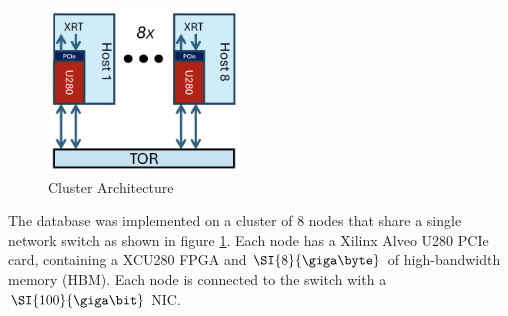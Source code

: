 
\begin{figure}
	\centering
	\includegraphics[width=2in]{oct-arch.jpg}
	\caption{Cluster Architecture}
	\label{oct-arch}
\end{figure}

The database was implemented on a cluster of 8 nodes that share a single network
switch as shown in figure \ref{oct-arch}. Each node has a Xilinx Alveo U280 PCIe
card, containing a XCU280 FPGA and $\SI{8}{\giga\byte}$ of high-bandwidth memory
(HBM). Each node is connected to the switch with a $\SI{100}{\giga\bit}$ NIC.
